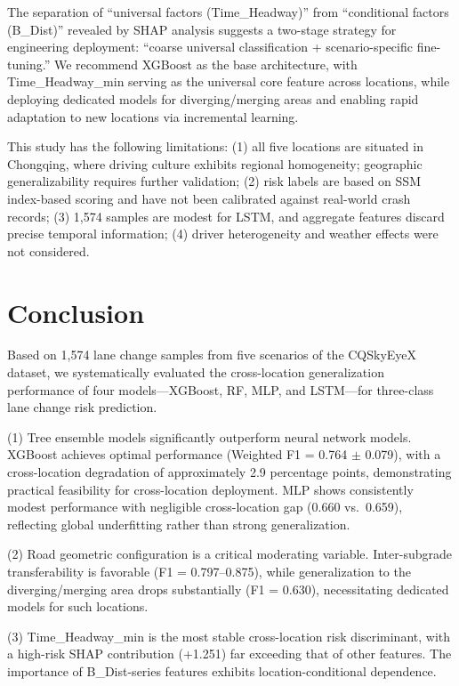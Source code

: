 \documentclass[preprint,review,12pt,a4paper]{elsarticle}
\begin{document}
The separation of ``universal factors (Time\_Headway)'' from ``conditional factors (B\_Dist)'' revealed by SHAP analysis suggests a two-stage strategy for engineering deployment: ``coarse universal classification + scenario-specific fine-tuning.'' We recommend XGBoost as the base architecture, with Time\_Headway\_min serving as the universal core feature across locations, while deploying dedicated models for diverging/merging areas and enabling rapid adaptation to new locations via incremental learning.

This study has the following limitations: (1) all five locations are situated in Chongqing, where driving culture exhibits regional homogeneity; geographic generalizability requires further validation; (2) risk labels are based on SSM index-based scoring and have not been calibrated against real-world crash records; (3) 1,574 samples are modest for LSTM, and aggregate features discard precise temporal information; (4) driver heterogeneity and weather effects were not considered.

\section{Conclusion}

Based on 1,574 lane change samples from five scenarios of the CQSkyEyeX dataset, we systematically evaluated the cross-location generalization performance of four models---XGBoost, RF, MLP, and LSTM---for three-class lane change risk prediction.

(1) Tree ensemble models significantly outperform neural network models. XGBoost achieves optimal performance (Weighted F1 = 0.764 $\pm$ 0.079), with a cross-location degradation of approximately 2.9 percentage points, demonstrating practical feasibility for cross-location deployment. MLP shows consistently modest performance with negligible cross-location gap (0.660 vs.\ 0.659), reflecting global underfitting rather than strong generalization.

(2) Road geometric configuration is a critical moderating variable. Inter-subgrade transferability is favorable (F1 = 0.797--0.875), while generalization to the diverging/merging area drops substantially (F1 = 0.630), necessitating dedicated models for such locations.

(3) Time\_Headway\_min is the most stable cross-location risk discriminant, with a high-risk SHAP contribution (+1.251) far exceeding that of other features. The importance of B\_Dist-series features exhibits location-conditional dependence.
\end{document}
